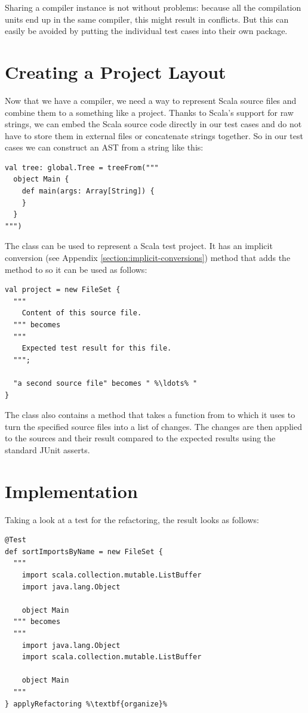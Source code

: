 \documentclass[10pt,a4paper,oneside]{scrreprt}
\begin{document}
Sharing a compiler instance is not without problems: because all the compilation units end up in the same compiler, this might result in conflicts. But this can easily be avoided by putting the individual test cases into their own package.

\section{Creating a Project Layout}

Now that we have a compiler, we need a way to represent Scala source files and combine them to a something like a project. Thanks to Scala's support for raw strings, we can embed the Scala source code directly in our test cases and do not have to store them in external files or concatenate strings together. So in our test cases we can construct an AST from a string like this:

\begin{lstlisting}
val tree: global.Tree = treeFrom("""
  object Main {
    def main(args: Array[String]) {
    }
  }
""")
\end{lstlisting}

The  class can be used to represent a Scala test project. It has an implicit conversion (see Appendix \vref{section:implicit-conversions}) method that adds the  method to  so it can be used as follows:

\begin{lstlisting}
val project = new FileSet {
  """
    Content of this source file.
  """ becomes
  """
    Expected test result for this file.
  """;

  "a second source file" becomes " %\ldots% "
}
\end{lstlisting}

The  class also contains a method  that takes a function from  to  which it uses to turn the specified source files into a list of changes. The changes are then applied to the sources and their result compared to the expected results using the standard JUnit asserts.

\section{Implementation}

Taking a look at a test for the  refactoring, the result looks as follows:

\begin{lstlisting}
@Test
def sortImportsByName = new FileSet {
  """
    import scala.collection.mutable.ListBuffer
    import java.lang.Object

    object Main
  """ becomes
  """
    import java.lang.Object
    import scala.collection.mutable.ListBuffer

    object Main
  """
} applyRefactoring %\textbf{organize}%
\end{lstlisting}
\end{document}
